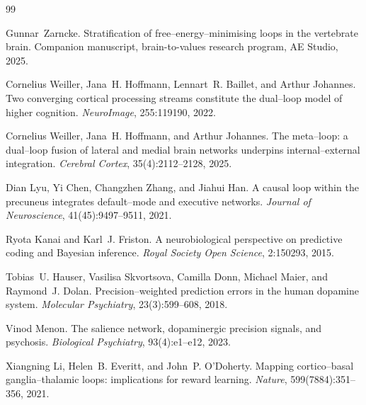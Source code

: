 \documentclass[11pt]{article}
\begin{document}

\begin{thebibliography}{99}

Gunnar~Zarncke.
\newblock Stratification of free--energy--minimising loops in the vertebrate brain.
\newblock Companion manuscript, brain-to-values research program, AE Studio, 2025.

Cornelius Weiller, Jana~H. Hoffmann, Lennart~R. Baillet, and Arthur Johannes.
\newblock Two converging cortical processing streams constitute the dual--loop model of higher cognition.
\newblock \emph{NeuroImage}, 255:119190, 2022.

Cornelius Weiller, Jana~H. Hoffmann, and Arthur Johannes.
\newblock The meta--loop: a dual--loop fusion of lateral and medial brain networks underpins internal--external integration.
\newblock \emph{Cerebral Cortex}, 35(4):2112--2128, 2025.

Dian Lyu, Yi Chen, Changzhen Zhang, and Jiahui Han.
\newblock A causal loop within the precuneus integrates default--mode and executive networks.
\newblock \emph{Journal of Neuroscience}, 41(45):9497--9511, 2021.

Ryota Kanai and Karl~J. Friston.
\newblock A neurobiological perspective on predictive coding and Bayesian inference.
\newblock \emph{Royal Society Open Science}, 2:150293, 2015.

Tobias~U. Hauser, Vasilisa Skvortsova, Camilla Donn, Michael Maier, and Raymond~J. Dolan.
\newblock Precision--weighted prediction errors in the human dopamine system.
\newblock \emph{Molecular Psychiatry}, 23(3):599--608, 2018.

Vinod Menon.
\newblock The salience network, dopaminergic precision signals, and psychosis.
\newblock \emph{Biological Psychiatry}, 93(4):e1--e12, 2023.

Xiangning Li, Helen~B. Everitt, and John~P. O'Doherty.
\newblock Mapping cortico--basal ganglia--thalamic loops: implications for reward learning.
\newblock \emph{Nature}, 599(7884):351--356, 2021.

\end{thebibliography}
\end{document}
